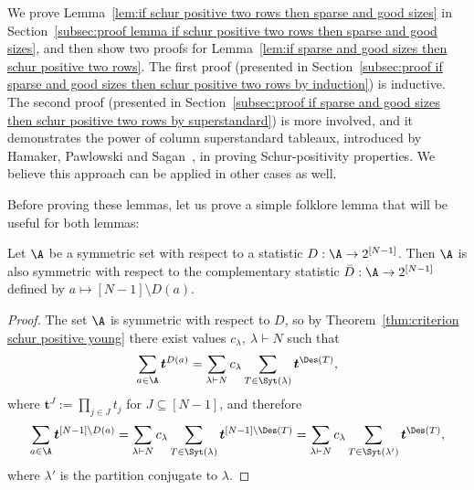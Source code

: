 We prove Lemma~\ref{lem:if schur positive two rows then sparse and good sizes} in Section~\ref{subsec:proof lemma if schur positive two rows then sparse and good sizes}, and then show two proofs for Lemma~\ref{lem:if sparse and good sizes then schur positive two rows}. The first proof (presented in Section~\ref{subsec:proof if sparse and good sizes then schur positive two rows by induction}) is inductive. The second proof (presented in Section~\ref{subsec:proof if sparse and good sizes then schur positive two rows by superstandard}) is more involved, and it demonstrates the power of column superstandard tableaux, introduced by Hamaker, Pawlowski and Sagan~\cite{S3_patterns_list}, in proving Schur-positivity properties. We believe this approach can be applied in other cases as well.

Before proving these lemmas, let us prove a simple folklore lemma that will be useful for both lemmas:
\begin{lemma}
\label{lem:symmetric complement is symmetric}
    Let $\A$ be a symmetric set with respect to a statistic $D:\A \to 2^{[N-1]}$. Then $\A$ is also symmetric with respect to the complementary statistic $\bar{D}:\A \to 2^{[N-1]}$ defined by $a \mapsto [N-1]\setminus D(a)$.
\end{lemma}
\begin{proof}
    The set $\A$ is symmetric with respect to $D$, so by Theorem~\ref{thm:criterion schur positive young} there exist values $c_{\lambda},\ \lambda \vdash N$ such that
    \[
        \sum_{a \in \A} \boldsymbol{t}^{D(a)} = \sum_{\lambda \vdash N} c_\lambda \sum_{T \in \Syt(\lambda)} \boldsymbol{t}^{\Des(T)},
    \]
    where $\boldsymbol{t}^J := \prod_{j \in J} t_j$ for $J \subseteq [N-1]$, and therefore
    \[
        \sum_{a \in \A} \boldsymbol{t}^{[N-1]\setminus D(a)} = \sum_{\lambda \vdash N} c_\lambda \sum_{T \in \Syt(\lambda)} \boldsymbol{t}^{[N-1]\setminus \Des(T)} = \sum_{\lambda \vdash N} c_\lambda \sum_{T \in \Syt(\lambda')} \boldsymbol{t}^{\Des(T)},
    \]
    where $\lambda'$ is the partition conjugate to $\lambda$.
\end{proof}

